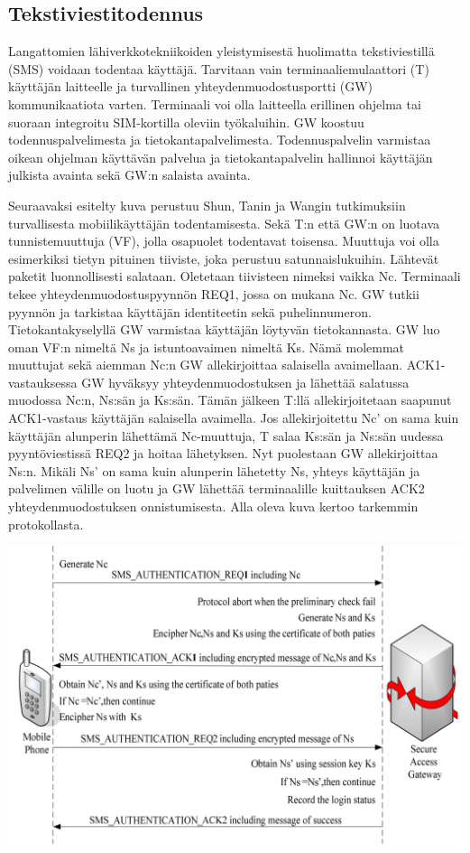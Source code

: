 \documentclass[finnish]{tktltiki2}
\theoremstyle{definition}
\theoremstyle{remark}
\begin{document}
\subsection{Tekstiviestitodennus}

Langattomien lähiverkkotekniikoiden yleistymisestä huolimatta tekstiviestillä (SMS) voidaan todentaa käyttäjä. Tarvitaan vain terminaaliemulaattori (T) käyttäjän laitteelle ja turvallinen yhteydenmuodostusportti (GW) kommunikaatiota varten. Terminaali voi olla laitteella erillinen ohjelma tai suoraan integroitu SIM-kortilla oleviin työkaluihin. GW koostuu todennuspalvelimesta ja tietokantapalvelimesta. Todennuspalvelin varmistaa oikean ohjelman käyttävän palvelua ja tietokantapalvelin hallinnoi käyttäjän julkista avainta sekä GW:n salaista avainta.

Seuraavaksi esitelty kuva perustuu Shun, Tanin ja Wangin \cite{sms} tutkimuksiin turvallisesta mobiilikäyttäjän todentamisesta. Sekä T:n että GW:n on luotava tunnistemuuttuja (VF), jolla osapuolet todentavat toisensa. Muuttuja voi olla esimerkiksi tietyn pituinen tiiviste, joka perustuu satunnaislukuihin. Lähtevät paketit luonnollisesti salataan. Oletetaan tiivisteen nimeksi vaikka Nc. Terminaali tekee yhteydenmuodostuspyynnön REQ1, jossa on mukana Nc. GW tutkii pyynnön ja tarkistaa käyttäjän identiteetin sekä puhelinnumeron. Tietokantakyselyllä GW varmistaa käyttäjän löytyvän tietokannasta. GW luo oman VF:n nimeltä Ns ja istuntoavaimen nimeltä Ks. Nämä molemmat muuttujat sekä aiemman Nc:n GW allekirjoittaa salaisella avaimellaan. ACK1-vastauksessa GW hyväksyy yhteydenmuodostuksen ja lähettää salatussa muodossa Nc:n, Ns:sän ja Ks:sän. Tämän jälkeen T:llä allekirjoitetaan saapunut ACK1-vastaus käyttäjän salaisella avaimella. Jos allekirjoitettu Nc' on sama kuin käyttäjän alunperin lähettämä Nc-muuttuja, T salaa Ks:sän ja Ns:sän uudessa pyyntöviestissä REQ2 ja hoitaa lähetyksen. Nyt puolestaan GW allekirjoittaa Ns:n. Mikäli Ns' on sama kuin alunperin lähetetty Ns, yhteys käyttäjän ja palvelimen välille on luotu ja GW lähettää terminaalille kuittauksen ACK2 yhteydenmuodostuksen onnistumisesta. Alla oleva kuva kertoo tarkemmin protokollasta.   

\includegraphics[scale=0.4]{sms-todennus}
\end{document}
